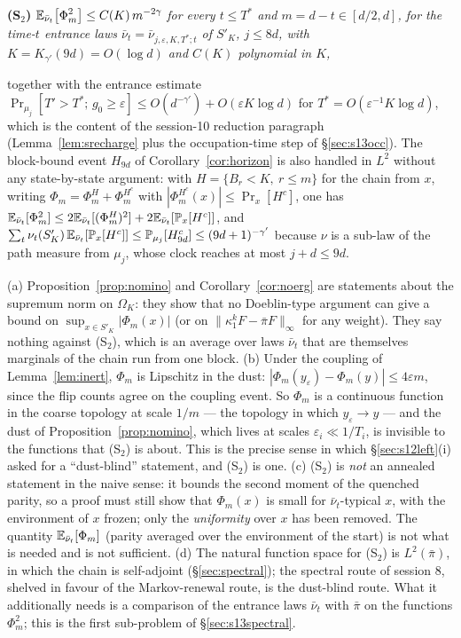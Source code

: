 \medskip
\noindent\textbf{(S$_2$)}\quad
$\displaystyle\mathbb{E}_{\bar\nu_t}\bigl[\Phi_{m}^2\bigr]\le C(K)\,m^{-2\gamma}$
\emph{for every $t\le T^*$ and $m=d-t\in[d/2,d]$, for the time-$t$
entrance laws $\bar\nu_t=\bar\nu_{j,\varepsilon,K,T^*;t}$ of $S'_K$,
$j\le8d$, with $K=K_{\gamma'}(9d)=O(\log d)$ and $C(K)$ polynomial
in $K$,}

\medskip
\noindent together with the entrance estimate
$\Pr_{\mu_j}[T'>T^*;\,g_0\ge\varepsilon]\le O(d^{-\gamma'})+O(\varepsilon K\log d)$
for $T^*=O(\varepsilon^{-1}K\log d)$, which is the content of the
session-10 reduction paragraph (Lemma~\ref{lem:srecharge} plus the
occupation-time step of \S\ref{sec:s13occ}).  The block-bound event
$H_{9d}$ of Corollary~\ref{cor:horizon} is also handled in $L^2$
without any state-by-state argument: with $H=\{B_r<K,\ r\le m\}$
for the chain from $x$, writing $\Phi_m=\Phi_m^H+\Phi_m^{H^c}$ with
$|\Phi_m^{H^c}(x)|\le\Pr_x[H^c]$, one has
$\mathbb{E}_{\bar\nu_t}[\Phi_m^2]\le2\mathbb{E}_{\bar\nu_t}[(\Phi_m^H)^2]+2\mathbb{E}_{\bar\nu_t}[\mathbb{P}_x[H^c]]$,
and $\sum_t\nu_t(S'_K)\,\mathbb{E}_{\bar\nu_t}[\mathbb{P}_x[H^c]]\le\mathbb{P}_{\mu_j}[H^c_{9d}]\le(9d+1)^{-\gamma'}$
because $\nu$ is a sub-law of the path measure from $\mu_j$, whose
clock reaches at most $j+d\le9d$.

\begin{remark}
\label{rem:dustblind}
(a) Proposition~\ref{prop:nomino} and Corollary~\ref{cor:noerg} are
statements about the supremum norm on $\Omega_K$: they show that no
Doeblin-type argument can give a bound on $\sup_{x\in S'_K}|\Phi_m(x)|$
(or on $\|\kappa_1^kF-\bar\pi F\|_\infty$ for any weight).  They say
nothing against (S$_2$), which is an average over laws $\bar\nu_t$
that are themselves marginals of the chain run from one block.
(b) Under the coupling of Lemma~\ref{lem:inert}, $\Phi_m$ is
Lipschitz in the dust: $|\Phi_m(y_\varepsilon)-\Phi_m(y)|\le4\varepsilon m$,
since the flip counts agree on the coupling event.  So $\Phi_m$ is a
continuous function in the coarse topology at scale $1/m$ --- the
topology in which $y_\varepsilon\to y$ --- and the dust of
Proposition~\ref{prop:nomino}, which lives at scales
$\varepsilon_i\ll1/T_i$, is invisible to the functions that (S$_2$)
is about.  This is the precise sense in which \S\ref{sec:s12left}(i)
asked for a ``dust-blind'' statement, and (S$_2$) is one.
(c) (S$_2$) is \emph{not} an annealed statement in the naive sense:
it bounds the second moment of the quenched parity, so a proof must
still show that $\Phi_m(x)$ is small for $\bar\nu_t$-typical $x$, with
the environment of $x$ frozen; only the \emph{uniformity} over $x$
has been removed.  The quantity $\mathbb{E}_{\bar\nu_t}[\Phi_m]$ (parity
averaged over the environment of the start) is not what is needed and
is not sufficient.
(d) The natural function space for (S$_2$) is $L^2(\bar\pi)$, in
which the chain is self-adjoint (\S\ref{sec:spectral}); the spectral
route of session 8, shelved in favour of the Markov-renewal route,
is the dust-blind route.  What it additionally needs is a comparison
of the entrance laws $\bar\nu_t$ with $\bar\pi$ on the functions
$\Phi_m^2$; this is the first sub-problem of \S\ref{sec:s13spectral}.
\end{remark}

